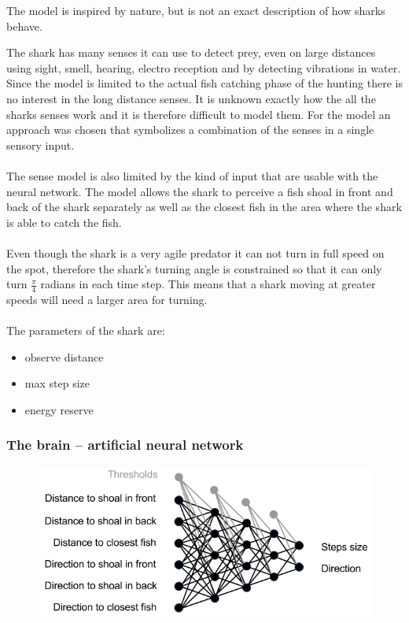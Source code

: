 The model is inspired by nature, but is not an exact description of how sharks
behave.

The shark has many senses it can use to detect prey, even on large distances
using sight, smell, hearing, electro reception and by detecting vibrations in
water\cite{shark_vision}\cite{shark_electric}. Since the model is limited
to the actual fish catching phase of the hunting there is no interest in the
long distance senses. It is unknown exactly how the all the sharks senses work and
it is therefore difficult to model them. For the model an approach was chosen
that symbolizes a combination of the senses in a single sensory input.\\
\\
The sense model is also limited by the kind of input that are usable with the
neural network. The model allows the shark to perceive a fish shoal in front
and back of the shark separately as well as the closest fish in the area where
the shark is able to catch the fish.\\
\\
Even though the shark is a very agile predator it can not turn in full speed on
the spot, therefore the shark's turning angle is constrained so that it can
only turn $\frac{\pi}{4}$ radians in each time step. This means that a shark
moving at greater speeds will need a larger area for turning.\\
\\
The parameters of the shark are:
\begin{itemize}
\item observe distance
\item max step size
\item energy reserve
\end{itemize}

\subsubsection{The brain -- artificial neural network}
\begin{figure}
\centering
\includegraphics[width=.7\textwidth]{figs/ann_structure.png}
\caption{\label{fig:ann}}
\end{figure}


